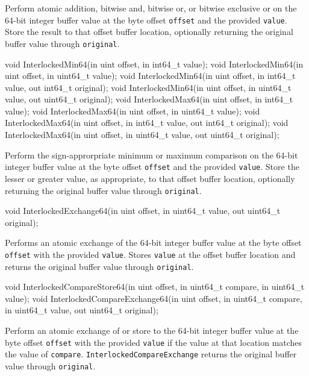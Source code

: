 Perform atomic addition, bitwise and, bitwise or, or bitwise exclusive or on
the 64-bit integer buffer value at the byte offset \texttt{offset} and the provided \texttt{value}.
Store the result to that offset buffer location,
optionally returning the original buffer value through \texttt{original}.

\begin{HLSL}
   void InterlockedMin64(in uint offset, in int64_t value);
   void InterlockedMin64(in uint offset, in uint64_t value);
   void InterlockedMin64(in uint offset, in int64_t value, out int64_t original);
   void InterlockedMin64(in uint offset, in uint64_t value, out uint64_t original);
   void InterlockedMax64(in uint offset, in int64_t value);
   void InterlockedMax64(in uint offset, in uint64_t value);
   void InterlockedMax64(in uint offset, in int64_t value, out int64_t original);
   void InterlockedMax64(in uint offset, in uint64_t value, out uint64_t original);
\end{HLSL}

Perform the sign-approrpriate minimum or maximum comparison on
the 64-bit integer buffer value at the byte offset \texttt{offset} and the provided \texttt{value}.
Store the lesser or greater value, as appropriate, to that offset buffer location,
optionally returning the original buffer value through \texttt{original}.

\begin{HLSL}
   void InterlockedExchange64(in uint offset, in uint64_t value, out uint64_t original);
\end{HLSL}

Performs an atomic exchange of
the 64-bit integer buffer value at the byte offset \texttt{offset} with the provided \texttt{value}.
Stores \texttt{value} at the offset buffer location
and returns the original buffer value through \texttt{original}.

\begin{HLSL}
   void InterlockedCompareStore64(in uint offset, in uint64_t compare,
                                   in uint64_t value);
   void InterlockedCompareExchange64(in uint offset, in uint64_t compare,
                                      in uint64_t value, out uint64_t original);
\end{HLSL}

Perform an atomic exchange of or store to
the 64-bit integer buffer value at the byte offset \texttt{offset} with the provided \texttt{value}
if the value at that location matches the value of \texttt{compare}.
\texttt{InterlockedCompareExchange} returns the original buffer value through \texttt{original}.

